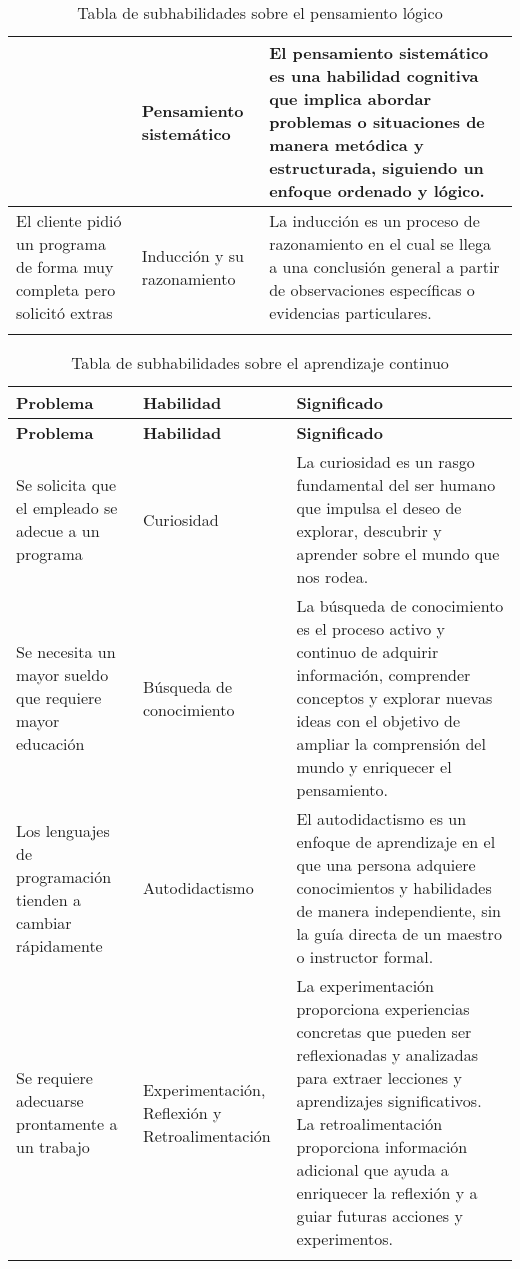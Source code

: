 \begin{longtable}{|p{6cm}|p{3cm}|p{8cm}|}
&
  Pensamiento sistemático & 
El pensamiento sistemático es una habilidad cognitiva que implica abordar problemas o situaciones de manera metódica y estructurada, siguiendo un enfoque ordenado y lógico. 

\\
\hline
El cliente pidió un programa de forma muy completa pero solicitó extras

&
Inducción y su razonamiento & 
La inducción es un proceso de razonamiento en el cual se llega a una conclusión general a partir de observaciones específicas o evidencias particulares. 

\\
\hline

\caption{Tabla de subhabilidades sobre el  pensamiento lógico}
\label{tab:estudios}
\end{longtable}


\begin{longtable}{|p{6cm}|p{3cm}|p{8cm}|}
\hline
\textbf{Problema}  & \textbf{Habilidad} & \textbf{Significado}  \\ 
\hline
\endfirsthead
\hline
\textbf{Problema}  & \textbf{Habilidad} & \textbf{Significado}  \\ 
\hline
\endhead
\hline
\endfoot

Se solicita que el empleado se adecue a un programa &  Curiosidad&La curiosidad es un rasgo fundamental del ser humano que impulsa el deseo de explorar, descubrir y aprender sobre el mundo que nos rodea.

 \\ 
 \hline
Se necesita un mayor sueldo que requiere mayor educación

&
Búsqueda de conocimiento
 & 
La búsqueda de conocimiento es el proceso activo y continuo de adquirir información, comprender conceptos y explorar nuevas ideas con el objetivo de ampliar la comprensión del mundo y enriquecer el pensamiento.

\\ 
 \hline
Los lenguajes de programación tienden a cambiar rápidamente

 &
 Autodidactismo
 & 
El autodidactismo es un enfoque de aprendizaje en el que una persona adquiere conocimientos y habilidades de manera independiente, sin la guía directa de un maestro o instructor formal.



\\ 
\hline
Se requiere adecuarse prontamente a un trabajo

&
Experimentación, Reflexión y Retroalimentación

 & 
La experimentación proporciona experiencias concretas que pueden ser reflexionadas y analizadas para extraer lecciones y aprendizajes significativos. La retroalimentación proporciona información adicional que ayuda a enriquecer la reflexión y a guiar futuras acciones y experimentos.

\\ 
\hline


\caption{Tabla de subhabilidades sobre el  aprendizaje continuo}
\label{tab:estudios}
\end{longtable}

